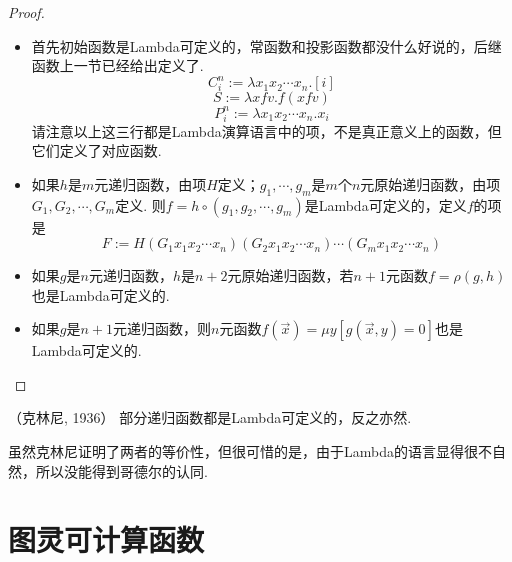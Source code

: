 \begin{proof}
    \begin{itemize}

        \item 首先初始函数是Lambda可定义的，常函数和投影函数都没什么好说的，后继函数上一节已经给出定义了.
        \[C^n_i := \lambda x_1x_2\cdots x_n. [i]\]
        \[S := \lambda xfv. f(xfv)\]
        \[P^n_i := \lambda x_1x_2\cdots x_n. x_i\]
        请注意以上这三行都是Lambda演算语言中的项，不是真正意义上的函数，但它们定义了对应函数.

        \item 如果\(h\)是\(m\)元递归函数，由项\(H\)定义；\(g_1,\cdots,g_m\)是\(m\)个\(n\)元原始递归函数，由项\(G_1,G_2,\cdots,G_m\)定义. 则\(f=h\circ(g_1,g_2,\cdots,g_m)\)是Lambda可定义的，定义\(f\)的项是
        \[F := H(G_1x_1x_2\cdots x_n)(G_2x_1x_2\cdots x_n)\cdots(G_mx_1x_2\cdots x_n)\]
        
        \item 如果\(g\)是\(n\)元递归函数，\(h\)是\(n+2\)元原始递归函数，若\(n+1\)元函数\(f=\rho(g,h)\)也是Lambda可定义的.
        \item 如果\(g\)是\(n+1\)元递归函数，则\(n\)元函数\(f(\vec x)=\mu y[g(\vec x,y)=0]\)也是Lambda可定义的.
    \end{itemize}
\end{proof}

\begin{theorem}{（克林尼, 1936）}
    部分递归函数都是Lambda可定义的，反之亦然.
\end{theorem}

虽然克林尼证明了两者的等价性，但很可惜的是，由于Lambda的语言显得很不自然，所以没能得到哥德尔的认同.

\section{图灵可计算函数}

